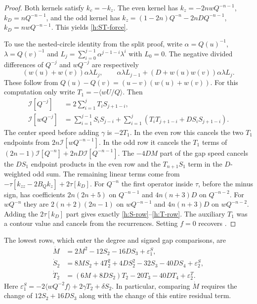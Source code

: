 \begin{proof}
Both kernels satisfy \(k_c=-k_z\). The even kernel has
\(k_z=-2nwQ^{-n-1}\), \(k_D=nQ^{-n-1}\), and the odd kernel has
\(k_z=(1-2n)Q^{-n}-2nDQ^{-n-1}\), \(k_D=nwQ^{-n-1}\).
This yields \eqref{h:ST-force}.

To use the nested-circle identity from the split proof, write
\(\alpha=Q(u)^{-1}\), \(\lambda=Q(v)^{-1}\) and
\(L_j=\sum_{i=0}^{j-1}\alpha^{j-1-i}\lambda^i\) with \(L_0=0\).
The negative divided differences of \(Q^{-j}\) and \(wQ^{-j}\)
are respectively
\[
 (w(u)+w(v))\alpha\lambda L_j,\qquad
 \alpha\lambda L_{j-1}+
   (D+w(u)w(v))\alpha\lambda L_j .
\]
These follow from \(Q(u)-Q(v)=(u-v)(w(u)+w(v))\).
For this computation only write \(T_1=-\langle wU/Q\rangle\).
Then
\begin{align*}
 \mathcal I[Q^{-j}]&=2\sum_{i=1}^{j} T_iS_{j+1-i},\\
 \mathcal I[wQ^{-j}]&=\sum_{i=1}^{j-1} S_iS_{j-i}
             +\sum_{i=1}^{j}(T_iT_{j+1-i}+DS_iS_{j+1-i}).
\end{align*}
The center speed before adding \(\gamma\) is \(-2T_1\). In the
even row this cancels the two \(T_1\) endpoints from
\(2n\mathcal I[wQ^{-n-1}]\). In the odd row it cancels
the \(T_1\) terms of
\((2n-1)\mathcal I[Q^{-n}]+2nD\mathcal I[Q^{-n-1}]\).
The \(-4DM\) part of the gap speed cancels the \(DS_1\) endpoint
products in the even row and the \(T_{n+1}S_1\) term in the
\(D\)-weighted odd sum. The remaining linear terms come from
\(-\tau[k_{zz}-2B_Q k_z]+2\tau[k_D]\). For \(Q^{-n}\) the first
operator inside \(\tau\), before the minus sign, has coefficients
\(2n(2n+5)\) on \(Q^{-n-1}\) and \(4n(n+3)D\) on \(Q^{-n-2}\).
For \(wQ^{-n}\) they are \(2(n+2)(2n-1)\) on \(wQ^{-n-1}\)
and \(4n(n+3)D\) on \(wQ^{-n-2}\).
Adding the \(2\tau[k_D]\) part gives exactly
\eqref{h:S-row}--\eqref{h:T-row}. The auxiliary \(T_1\) was a
contour value and cancels from the recurrences. Setting \(f=0\)
recovers \cite[Eqs.~(3.11)--(3.12)]{agc}.
\end{proof}

The lowest rows, which enter the degree and signed gap comparisons, are
\begin{equation}\label{h:low}
 \begin{split}
 \dot M &=2M^2-12S_2-16DS_3+\varepsilon^S_1,\\
 \dot S_2 &=8MS_2+4T_2^2+4DS_2^2-32S_3-40DS_4+\varepsilon^S_2,\\
 \dot T_2 &=(6M+8DS_2)T_2-20T_3-40DT_4+\varepsilon^T_2 .
 \end{split}
\end{equation}
Here \(\varepsilon^S_1=-2\langle wQ^{-2}f\rangle
+2\gamma T_2+\delta S_2\). In particular, comparing \(\dot M\)
requires the change of \(12S_2+16DS_3\) along with the change
of this entire residual term.

